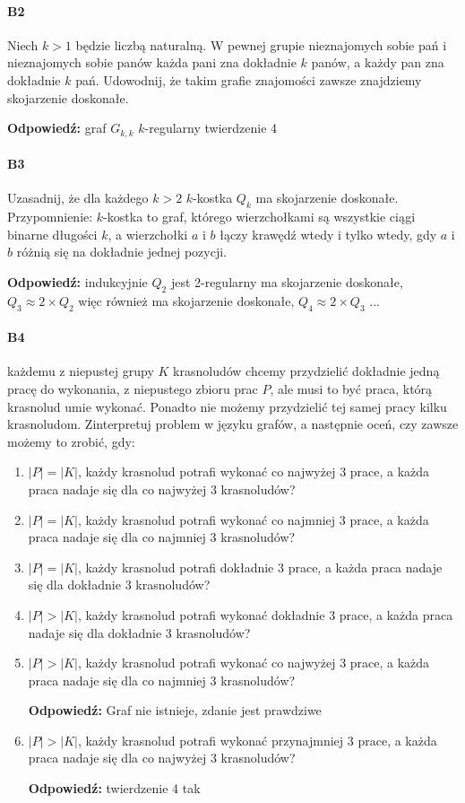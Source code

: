 \documentclass[a4paper,12pt]{article}
\theoremstyle{definition}%
\theoremstyle{definition}
\theoremstyle{problem}
\begin{document}
\paragraph{B2} Niech $k > 1$ będzie liczbą naturalną. W pewnej grupie nieznajomych sobie pań i nieznajomych sobie panów każda pani zna dokładnie $k$ panów, a każdy pan zna dokładnie $k$ pań. Udowodnij, że takim grafie znajomości zawsze znajdziemy skojarzenie doskonałe.

\textbf{Odpowiedź: } graf $G_{k,k}$ $k$-regularny twierdzenie 4
\paragraph{B3} Uzasadnij, że dla każdego $k > 2$ $k$-kostka $Q_k$ ma skojarzenie doskonałe. Przypomnienie: $k$-kostka to graf, którego wierzchołkami są wszystkie ciągi binarne długości $k$, a wierzchołki $a$ i $b$ łączy krawędź wtedy i tylko wtedy, gdy $a$ i $b$ różnią się na dokładnie jednej pozycji.

\textbf{Odpowiedź: } indukcyjnie $Q_2$ jest 2-regularny ma skojarzenie doskonałe, $Q_3\approx 2\times Q_2$ więc również ma skojarzenie doskonałe, $Q_4\approx 2\times Q_3$ ...
\paragraph{B4} każdemu z niepustej grupy $K$ krasnoludów chcemy przydzielić dokładnie jedną pracę do wykonania, z niepustego zbioru prac $P$, ale musi to być praca, którą krasnolud umie wykonać. Ponadto nie możemy przydzielić tej samej pracy kilku krasnoludom. Zinterpretuj problem w języku grafów, a następnie oceń, czy zawsze możemy to zrobić, gdy:
\begin{enumerate}[label=\alph*)]
\item $|P| = |K|$, każdy krasnolud potrafi wykonać co najwyżej 3 prace, a każda praca nadaje się dla co najwyżej 3 krasnoludów?
\item $|P| = |K|$, każdy krasnolud potrafi wykonać co najmniej 3 prace, a każda praca nadaje się dla co najmniej 3 krasnoludów?
\item $|P| = |K|$, każdy krasnolud potrafi dokładnie 3 prace, a każda praca nadaje się dla dokładnie 3 krasnoludów?
\item $|P| > |K|$, każdy krasnolud potrafi wykonać dokładnie 3 prace, a każda praca nadaje się dla dokładnie 3 krasnoludów?
\item $|P| > |K|$, każdy krasnolud potrafi wykonać co najwyżej 3 prace, a każda praca nadaje się dla co najmniej 3 krasnoludów?

\textbf{Odpowiedź: }Graf nie istnieje, zdanie jest prawdziwe
\item $|P| > |K|$, każdy krasnolud potrafi wykonać przynajmniej 3 prace, a każda praca nadaje się dla co najwyżej 3 krasnoludów?

\textbf{Odpowiedź: } twierdzenie 4 tak
\end{enumerate}
\end{document}
